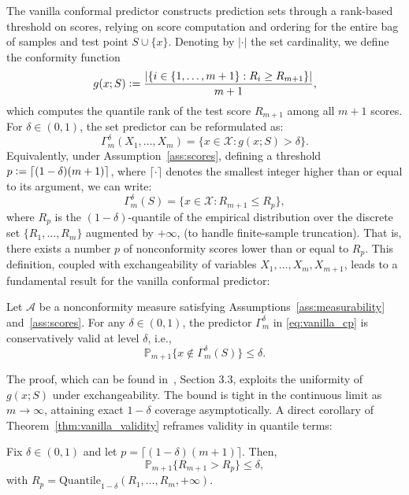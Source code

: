 The vanilla conformal predictor constructs prediction sets through a rank-based threshold on scores, relying on score computation and ordering for the entire bag of samples and test point $S \cup \{x\}$. Denoting by $| \cdot |$ the set cardinality, we define the conformity function
\[
g(x; S) \vcentcolon= \frac{|\{i \in \{1, \ldots, m+1\} : R_i \ge R_{m+1}\}|}{m+1},
\]
which computes the quantile rank of the test score $R_{m+1}$ among all $m+1$ scores. For $\delta \in (0,1)$, the set predictor can be reformulated as:
\begin{equation}
\label{eq:vanilla_cp}
\Gamma^\delta_m(X_1, \ldots, X_m) = \{ x \in \mathcal{X} : g(x; S) > \delta \}.
\end{equation}
Equivalently, under Assumption~\ref{ass:scores}, defining a threshold $p \vcentcolon= \lceil (1-\delta)(m+1) \rceil$, where $\lceil \cdot \rceil$ denotes the smallest integer higher than or equal to its argument, we can write:
\begin{equation}
\label{eq:quantile_form}
\Gamma^\delta_m(S) = \{ x \in \mathcal{X} : R_{m+1} \le R_{p} \},
\end{equation}
where $R_{p}$ is the $(1-\delta)$-quantile of the empirical distribution over the discrete set $\{R_1, \ldots, R_m\}$ augmented by $+\infty$, (to handle finite-sample truncation). That is, there exists a number $p$ of nonconformity scores lower than or equal to $R_p$. This definition, coupled with exchangeability of variables $X_1, \ldots, X_m, X_{m+1}$, leads to a fundamental result for the vanilla conformal predictor:
\begin{theorem}
\label{thm:vanilla_validity}
Let $\mathcal{A}$ be a nonconformity measure satisfying Assumptions~\ref{ass:measurability} and~\ref{ass:scores}. For any $\delta \in (0,1)$, the predictor $\Gamma^\delta_m$ in \eqref{eq:vanilla_cp} is conservatively valid at level $\delta$, i.e.,
\[
\mathbb{P}_{m+1} \big\{ x \notin \Gamma^\delta_m(S) \big\} \le \delta.
\]
\end{theorem}
The proof, which can be found in~\cite{Angelopoulos2025}, Section 3.3, exploits the uniformity of $g(x; S)$ under exchangeability. The bound is tight in the continuous limit as $m \to \infty$, attaining exact $1-\delta$ coverage asymptotically. A direct corollary of Theorem~\ref{thm:vanilla_validity} reframes validity in quantile terms:
\begin{corollary}
\label{cor:quantile}
Fix $\delta \in (0,1)$ and let $p = \lceil (1-\delta)(m+1) \rceil$. Then,
\[
\mathbb{P}_{m+1} \big \{ R_{m+1} > R_p \big \} \le \delta,
\]
with $R_p = \mathrm{Quantile}_{1-\delta}(R_1, \ldots, R_m, +\infty)$.
\end{corollary}

